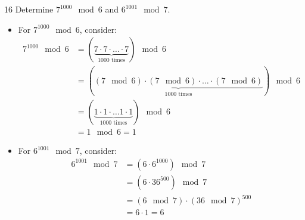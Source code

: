 \begin{hwproblem}
{16}{
    Determine \(7^{1000} \mod 6\) and \(6^{1001} \mod 7\).
}

\begin{itemize}
    \item For \(7^{1000} \mod 6\), consider:
        \[
        \begin{aligned}
            7^{1000} \mod 6 &= \left(\underbrace{7 \cdot 7 \cdot \ldots \cdot 7}_{\text{1000 times}}\right) \mod 6 \\
                            &= \left(\underbrace{(7 \mod 6) \cdot (7 \mod 6) \cdot \ldots \cdot (7 \mod 6)}_{\text{1000 times}}\right) \mod 6 \\
                            &= \left(\underbrace{1 \cdot 1 \cdot \ldots 1 \cdot 1}_{\text{1000 times}}\right) \mod 6 \\
                            &= 1 \mod 6 = 1
        \end{aligned}
        \]

    \item For \(6^{1001} \mod 7\), consider:
        \[
        \begin{aligned}
            6^{1001} \mod 7 &= \left(6 \cdot 6^{1000}\right) \mod 7 \\
                            &= \left(6 \cdot 36^{500}\right) \mod 7 \\
                            &= (6 \mod 7) \cdot (36 \mod 7)^{500} \\
                            &= 6 \cdot 1 = 6
        \end{aligned}
        \]
\end{itemize}
    
\end{hwproblem}
